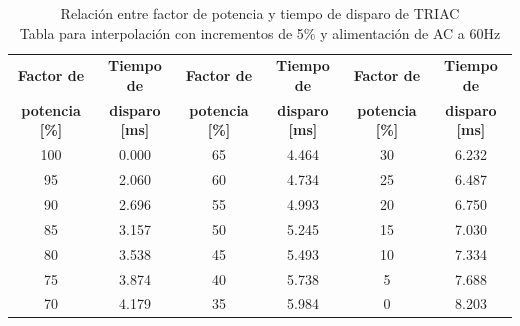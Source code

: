 \begin{table}[H]
	\centering
	\captionsetup{justification=centering,margin=2cm}
	\caption{Relación entre factor de potencia y tiempo de disparo de TRIAC\\Tabla para interpolación con incrementos de 5\% y alimentación de AC a 60Hz}%
	\label{tbl:trigger-time}
	\begin{tabular}{c c  c c  c c}
		\toprule
		\textbf{\small Factor de} &
		\textbf{\small Tiempo de} &
		\textbf{\small Factor de} &
		\textbf{\small Tiempo de} &
		\textbf{\small Factor de} &
		\textbf{\small Tiempo de}\\
		\textbf{\small potencia [\%]} &
		\textbf{\small disparo [ms]}  &
		\textbf{\small potencia [\%]} &
		\textbf{\small disparo [ms]}  &
		\textbf{\small potencia [\%]} &
		\textbf{\small disparo [ms]} \\
		\midrule
		100 & 0.000 &  65 & 4.464 &  30 & 6.232 \\
		 95 & 2.060 &  60 & 4.734 &  25 & 6.487 \\
		 90 & 2.696 &  55 & 4.993 &  20 & 6.750 \\
		 85 & 3.157 &  50 & 5.245 &  15 & 7.030 \\
		 80 & 3.538 &  45 & 5.493 &  10 & 7.334 \\
		 75 & 3.874 &  40 & 5.738 &   5 & 7.688 \\
		 70 & 4.179 &  35 & 5.984 &   0 & 8.203 \\
		\bottomrule
	\end{tabular}
\end{table}
